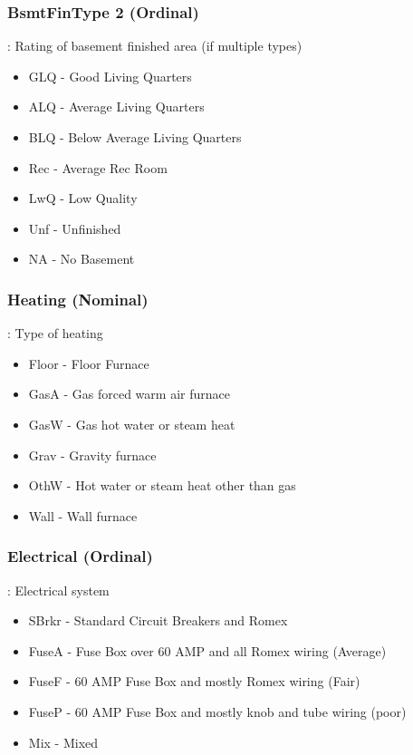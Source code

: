 \documentclass[sigconf]{acmart}
\begin{document}
	\subsubsection{BsmtFinType 2  (Ordinal)}: Rating of basement finished area (if multiple types)
	\begin{itemize}
		\item  GLQ - Good Living Quarters
		\item  ALQ - Average Living Quarters
		\item  BLQ - Below Average Living Quarters
		\item  Rec - Average Rec Room
		\item  LwQ - Low Quality
		\item  Unf - Unfinished
		\item  NA - No Basement
	\end{itemize}
	\subsubsection{Heating (Nominal)}: Type of heating
	\begin{itemize}
		\item  Floor - Floor Furnace
		\item  GasA - Gas forced warm air furnace
		\item  GasW - Gas hot water or steam heat
		\item  Grav - Gravity furnace
		\item  OthW - Hot water or steam heat other than gas
		\item  Wall - Wall furnace
	\end{itemize}
	
	\subsubsection{Electrical (Ordinal)}: Electrical system
	\begin{itemize}
		\item  SBrkr - Standard Circuit Breakers and Romex
		\item  FuseA - Fuse Box over 60 AMP and all Romex wiring (Average)
		\item  FuseF - 60 AMP Fuse Box and mostly Romex wiring (Fair)
		\item  FuseP - 60 AMP Fuse Box and mostly knob and tube wiring (poor)
		\item  Mix - Mixed
	\end{itemize}
	
	
	
\end{document}
